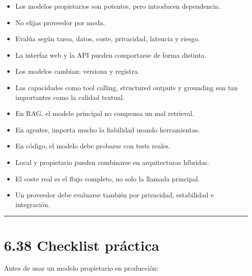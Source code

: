 \begin{itemize}
\tightlist
\item
  Los modelos propietarios son potentes, pero introducen dependencia.
\item
  No elijas proveedor por moda.
\item
  Evalúa según tarea, datos, coste, privacidad, latencia y riesgo.
\item
  La interfaz web y la API pueden comportarse de forma distinta.
\item
  Los modelos cambian: versiona y registra.
\item
  Las capacidades como tool calling, structured outputs y grounding son
  tan importantes como la calidad textual.
\item
  En RAG, el modelo principal no compensa un mal retrieval.
\item
  En agentes, importa mucho la fiabilidad usando herramientas.
\item
  En código, el modelo debe probarse con tests reales.
\item
  Local y propietario pueden combinarse en arquitecturas híbridas.
\item
  El coste real es el flujo completo, no solo la llamada principal.
\item
  Un proveedor debe evaluarse también por privacidad, estabilidad e
  integración.
\end{itemize}

\begin{center}\rule{0.5\linewidth}{0.5pt}\end{center}

\section{6.38 Checklist práctica}\label{checklist-pruxe1ctica-5}

Antes de usar un modelo propietario en producción:


